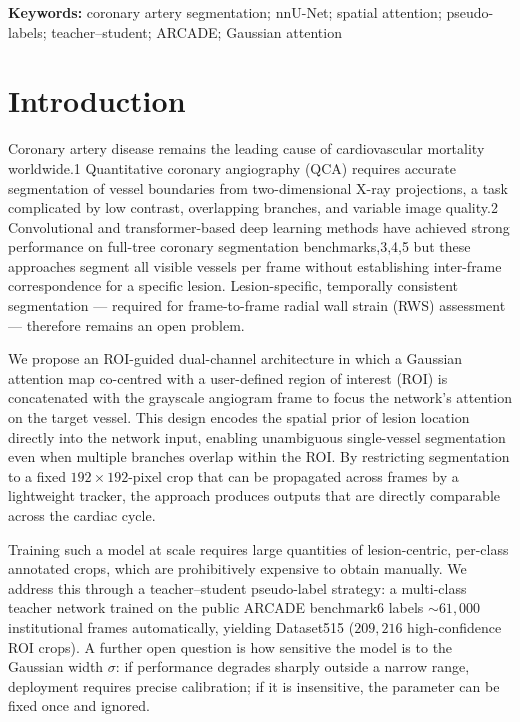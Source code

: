 \documentclass[12pt]{article}
\begin{document}
\textbf{Keywords:} coronary artery segmentation; nnU-Net; spatial attention;
pseudo-labels; teacher–student; ARCADE; Gaussian attention

\section{Introduction}

Coronary artery disease remains the leading cause of cardiovascular mortality
worldwide.1 Quantitative coronary angiography (QCA) requires accurate
segmentation of vessel boundaries from two-dimensional X-ray projections, a
task complicated by low contrast, overlapping branches, and variable image
quality.2 Convolutional and transformer-based deep learning methods have
achieved strong performance on full-tree coronary segmentation
benchmarks,3,4,5 but these approaches segment all visible vessels per
frame without establishing inter-frame correspondence for a specific lesion.
Lesion-specific, temporally consistent segmentation — required for
frame-to-frame radial wall strain (RWS) assessment — therefore remains
an open problem.

We propose an ROI-guided dual-channel architecture in which a Gaussian
attention map co-centred with a user-defined region of interest (ROI) is
concatenated with the grayscale angiogram frame to focus the network's
attention on the target vessel. This design encodes the spatial prior of
lesion location directly into the network input, enabling unambiguous
single-vessel segmentation even when multiple branches overlap within the
ROI. By restricting segmentation to a fixed $192\times192$-pixel crop that
can be propagated across frames by a lightweight tracker, the approach
produces outputs that are directly comparable across the cardiac cycle.

Training such a model at scale requires large quantities of lesion-centric,
per-class annotated crops, which are prohibitively expensive to obtain
manually. We address this through a teacher–student pseudo-label strategy:
a multi-class teacher network trained on the public ARCADE benchmark6
labels ${\sim}61{,}000$ institutional frames automatically, yielding
Dataset515 ($209{,}216$ high-confidence ROI crops). A further open question
is how sensitive the model is to the Gaussian width $\sigma$: if
performance degrades sharply outside a narrow range, deployment requires
precise calibration; if it is insensitive, the parameter can be fixed
once and ignored.
\end{document}
